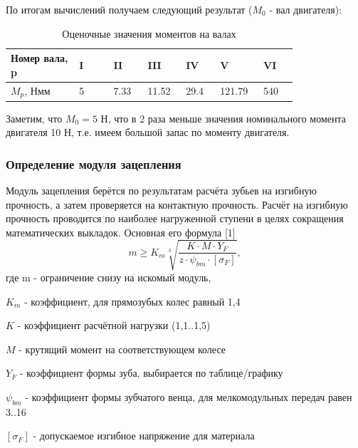 \documentclass[14pt,a4paper,russian]{scrartcl}
\begin{document}
        По итогам вычислений получаем следующий результат (\( M_0 \) - вал двигателя):
        \begin{table}[h!]
            \begin{center}
                \begin{tabular}{p{0.2\linewidth}p{0.1\linewidth}p{0.1\linewidth}p{0.1\linewidth}p{0.1\linewidth}p{0.1\linewidth}p{0.1\linewidth}}
                    \hline
                    Номер вала, p & I & II & III & IV & V & VI \\
                    \hline
                    \( M_p \), Нмм & 5 & 7.33 & 11.52 & 29.4 & 121.79 & 540 \\
                    \hline
                \end{tabular}
                \caption{Оценочные значения моментов на валах}\label{tab:moments__shaft_estimate}
            \end{center}
        \end{table}

        Заметим, что \( M_0=5 \) Н, что в 2 раза меньше значения номинального момента двигателя 10 Н,
        т.е. имеем большой запас по моменту двигателя.

    \subsubsection{Определение модуля зацепления}
        Модуль зацепления берётся по результатам расчёта зубьев на изгибную прочность, а затем проверяется
        на контактную прочность. Расчёт на изгибную прочность проводится по наиболее нагруженной ступени в целях
        сокращения математических выкладок. Основная его формула [1]
        \[ m \geq K_m\sqrt[3]{\frac{K\cdot M\cdot Y_F}{z\cdot\psi_{bm}\cdot[\sigma_F]}}, \]
        где m - ограничение снизу на искомый модуль,\par
            \( K_m \) - коэффициент, для прямозубых колес равный 1,4\par 
            \( K \) - коэффициент расчётной нагрузки (1,1..1,5)\par
            \( M \) - крутящий момент на соответствующем колесе\par
            \( Y_F \) - коэффициент формы зуба, выбирается по таблице/графику\par
            \( \psi_{bm} \) - коэффициент формы зубчатого венца, для мелкомодульных передач равен 3..16\par
            \( [\sigma_F] \) - допускаемое изгибное напряжение для материала\par
        
\end{document}
